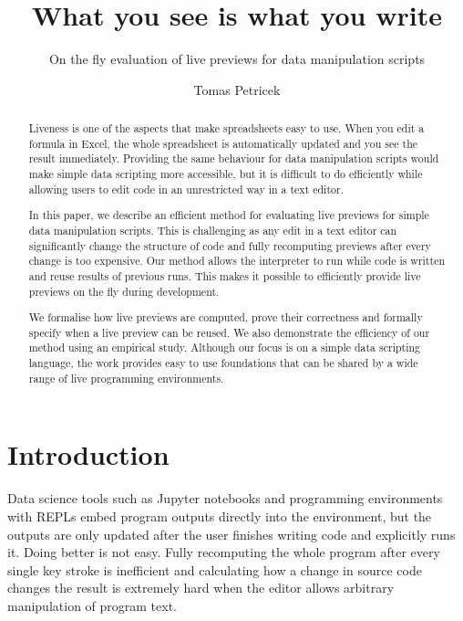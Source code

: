 \documentclass[sigplan,10pt]{acmart}\settopmatter{printfolios=true,printccs=false,printacmref=false}
\title{What you see is what you write}
\subtitle{On the fly evaluation of live previews for data manipulation scripts}
\author{Tomas Petricek}
\affiliation{
  \institution{The Alan Turing Institute}
  \country{London, United Kingdom}
}
\theoremstyle{plain}
\theoremstyle{definition}
\begin{document}
\begin{abstract}
Liveness is one of the aspects that make spreadsheets easy to use. When you edit a formula in 
Excel, the whole spreadsheet is automatically updated and you see the result immediately. 
Providing the same behaviour for data manipulation scripts would make simple data scripting 
more accessible, but it is difficult to do efficiently while allowing users to edit code in 
an unrestricted way in a text editor.  

In this paper, we describe an efficient method for evaluating live previews for simple data 
manipulation scripts. This is challenging as any edit in a text editor can significantly 
change the structure of code and fully recomputing previews after every change is too expensive. 
Our method allows the interpreter to run while code is written and reuse results of previous 
runs. This makes it possible to efficiently provide live previews on the fly during development.

We formalise how live previews are computed, prove their correctness and formally specify when 
a live preview can be reused. We also demonstrate the efficiency of our method using an empirical 
study. Although our focus is on a simple data scripting language, the work provides easy to use 
foundations that can be shared by a wide range of live programming environments.
\end{abstract}
\maketitle


\section{Introduction}
\label{sec:intro}

Data science tools such as Jupyter notebooks \cite{jupyter} and programming environments
with REPLs \cite{rmarkdown,drscheme} embed program outputs directly into the environment, 
but the outputs are only updated after the user finishes writing code and explicitly runs it.
Doing better is not easy. Fully recomputing the whole program after every single key stroke is 
inefficient and calculating how a change in source code changes the result is extremely hard 
when the editor allows arbitrary manipulation of program text. 
\end{document}
